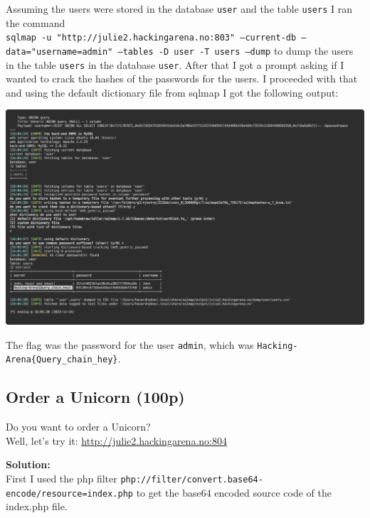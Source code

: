 Assuming the users were stored in the database \texttt{user} and the table \texttt{users} I ran the command
\\\texttt{sqlmap -u "http://julie2.hackingarena.no:803" --current-db  --data="username=admin" --tables -D user -T users --dump}
to dump the users in the table \texttt{users} in the database \texttt{user}.
After that I got a prompt asking if I wanted to crack the hashes of the passwords for the users. I proceeded with that and using the default dictionary file from sqlmap I got the following output:

\begin{center}
    \includegraphics[width=15cm]{img/Web hacking/Tricky login/Screenshot 2023-11-24 at 16.09.41.png}
\end{center}

The flag was the password for the user \texttt{admin}, which was \texttt{Hacking-Arena\{Query\_chain\_hey\}}.

\newpage
\subsection{Order a Unicorn (100p)}
\addtocounter{points}{100}
Do you want to order a Unicorn?
\\Well, let's try it: \url{http://julie2.hackingarena.no:804}

\textbf{Solution:}\\
First I used the php filter \texttt{php://filter/convert.base64-encode/resource=index.php} to get the base64 encoded source code of the index.php file. 

